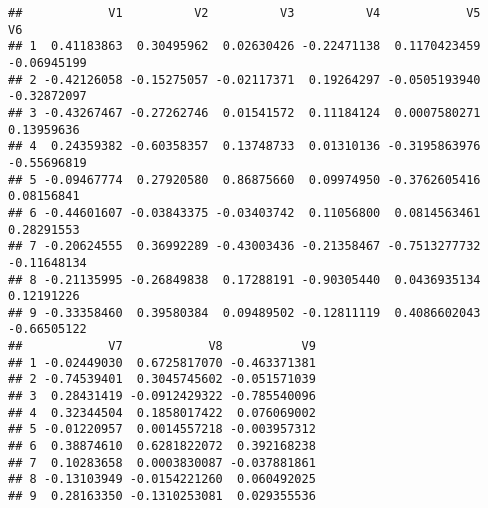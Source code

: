 \documentclass[
]{article}
\newenvironment{Shaded}{\begin{snugshade}}{\end{snugshade}}
\newcommand{\DataTypeTok}[1]{\textcolor[rgb]{0.13,0.29,0.53}{#1}}
\newcommand{\DecValTok}[1]{\textcolor[rgb]{0.00,0.00,0.81}{#1}}
\newcommand{\KeywordTok}[1]{\textcolor[rgb]{0.13,0.29,0.53}{\textbf{#1}}}
\newcommand{\NormalTok}[1]{#1}
\newcommand{\OperatorTok}[1]{\textcolor[rgb]{0.81,0.36,0.00}{\textbf{#1}}}
\newcommand{\StringTok}[1]{\textcolor[rgb]{0.31,0.60,0.02}{#1}}
\begin{document}
\begin{Shaded}
\end{Shaded}

\begin{verbatim}
##            V1          V2          V3          V4            V5          V6
## 1  0.41183863  0.30495962  0.02630426 -0.22471138  0.1170423459 -0.06945199
## 2 -0.42126058 -0.15275057 -0.02117371  0.19264297 -0.0505193940 -0.32872097
## 3 -0.43267467 -0.27262746  0.01541572  0.11184124  0.0007580271  0.13959636
## 4  0.24359382 -0.60358357  0.13748733  0.01310136 -0.3195863976 -0.55696819
## 5 -0.09467774  0.27920580  0.86875660  0.09974950 -0.3762605416  0.08156841
## 6 -0.44601607 -0.03843375 -0.03403742  0.11056800  0.0814563461  0.28291553
## 7 -0.20624555  0.36992289 -0.43003436 -0.21358467 -0.7513277732 -0.11648134
## 8 -0.21135995 -0.26849838  0.17288191 -0.90305440  0.0436935134  0.12191226
## 9 -0.33358460  0.39580384  0.09489502 -0.12811119  0.4086602043 -0.66505122
##            V7            V8           V9
## 1 -0.02449030  0.6725817070 -0.463371381
## 2 -0.74539401  0.3045745602 -0.051571039
## 3  0.28431419 -0.0912429322 -0.785540096
## 4  0.32344504  0.1858017422  0.076069002
## 5 -0.01220957  0.0014557218 -0.003957312
## 6  0.38874610  0.6281822072  0.392168238
## 7  0.10283658  0.0003830087 -0.037881861
## 8 -0.13103949 -0.0154221260  0.060492025
## 9  0.28163350 -0.1310253081  0.029355536
\end{verbatim}
\end{document}

